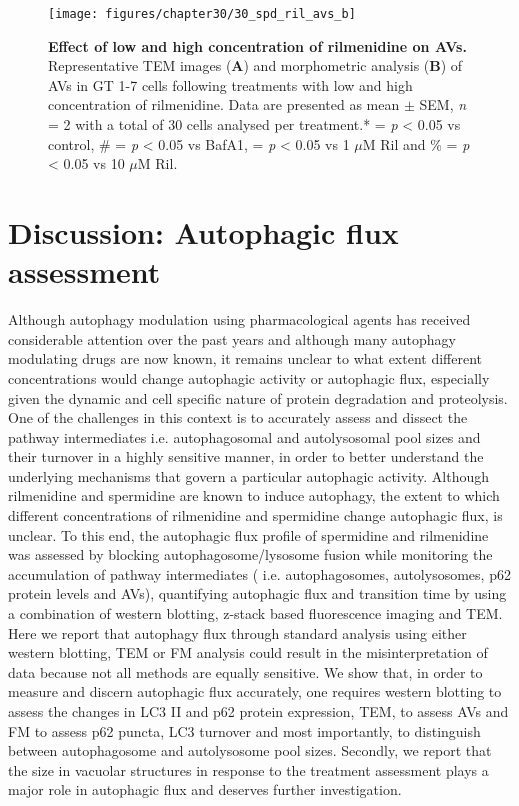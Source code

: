 {\begin{landscape}
\begin{figure}[!htbp]
\center
  \texttt{[image: figures/chapter30/30\_spd\_ril\_avs\_b]}
  \caption[Effect of low and high concentration of rilmenidine on AVs]{\textbf{Effect of low and high concentration of rilmenidine on AVs.} Representative TEM images (\textbf{A}) and morphometric analysis (\textbf{B}) of AVs in GT 1-7 cells following treatments with low and high concentration of rilmenidine. Data are presented as mean $\pm$ SEM, \textit{n} = 2 with a total of 30 cells analysed per treatment.* = \textit{p} < 0.05 vs control, \# = \textit{p} < 0.05 vs BafA1, \@ = \textit{p} < 0.05 vs 1 $\mu$M Ril and  \% = \textit{p} < 0.05 vs 10 $\mu$M Ril.}
  \label{fig:30_spd_ril_avs_b}
\end{figure} 
\end{landscape}

\section{Discussion: Autophagic flux assessment}

Although autophagy modulation using pharmacological agents has received considerable attention over the past years and although many autophagy modulating drugs are now known, it remains unclear to what extent different concentrations would change autophagic activity or autophagic flux, especially given the dynamic and cell specific nature of protein degradation and proteolysis. One of the challenges in this context is to accurately assess and dissect the pathway intermediates i.e. autophagosomal and autolysosomal pool sizes and their turnover in a highly sensitive manner, in order to better understand the underlying mechanisms that govern a particular autophagic activity. Although rilmenidine and spermidine are known to induce autophagy, the extent to which different concentrations of rilmenidine and spermidine  change  autophagic flux, is unclear. To this end, the autophagic flux profile of spermidine and rilmenidine was assessed by blocking autophagosome/lysosome fusion while monitoring the accumulation of pathway intermediates ( i.e. autophagosomes, autolysosomes, p62 protein levels and AVs), quantifying autophagic flux and transition time by using a combination of western blotting, z-stack based fluorescence imaging and TEM. Here we report that autophagy flux through standard analysis using either western blotting, TEM or FM analysis could result in the misinterpretation of data because not all methods are equally sensitive. We show that, in order to measure and discern autophagic flux accurately, one requires western blotting to assess the changes in LC3 II and p62 protein expression, TEM, to assess AVs and FM to assess p62 puncta, LC3 turnover and most importantly, to distinguish between autophagosome and autolysosome pool sizes. Secondly, we report that the size in vacuolar structures in response to the treatment assessment plays a major role in autophagic flux and deserves further investigation.

}
